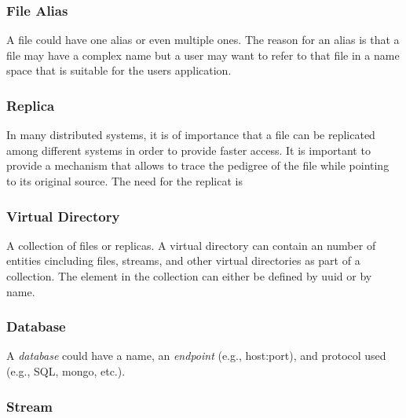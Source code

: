 \documentclass[10pt]{article}
\begin{document}

\subsubsection{File Alias}

A file could have one alias or even multiple ones. The reason for an alias is that a file may have a complex name but a user may want to refer to that file in a name space that is suitable for the users application.


\subsubsection{Replica}

In many distributed systems, it is of importance that a file can be
replicated among different systems in order to provide faster
access. It is important to provide a mechanism that allows to trace
the pedigree of the file while pointing to its original source. The need for the replicat is  




\subsubsection{Virtual Directory}

A collection of files or replicas. A virtual directory can contain an
number of entities cincluding files, streams, and other virtual
directories as part of a collection. The element in the collection can
either be defined by uuid or by name. 


\subsubsection{Database}

A \textit{database} could have a name, an \textit{endpoint} (e.g., host:port),
and protocol used (e.g., SQL, mongo, etc.).


\subsubsection{Stream} 
\end{document}
